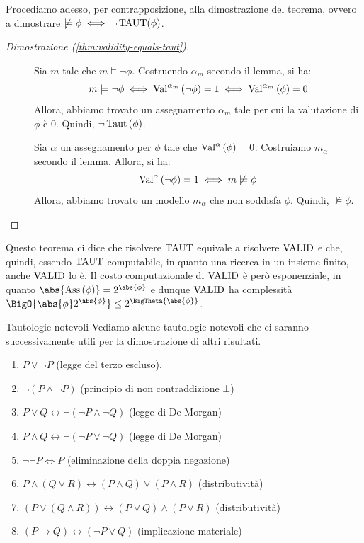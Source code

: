Procediamo adesso, per contrapposizione, alla dimostrazione del teorema, ovvero a dimostrare \(\not\models \phi \iff \neg \Taut(\phi)\).
\begin{proof}[Dimostrazione (\ref{thm:validity-equals-taut})]
  \begin{description}
    \item[\qi{\(\implies\)}]
      Sia \(m\) tale che \(m \models \neg \phi\).
      Costruendo \(\alpha_{m}\) secondo il lemma, si ha:
      \[m\models \neg \phi \iff \Val{\alpha_{m}}[\neg\phi]=1 \iff \Val{\alpha_{m}}[\phi]=0\]
      Allora, abbiamo trovato un assegnamento \(\alpha_{m}\) tale per cui la valutazione di \(\phi\) è \(0\). Quindi, \(\neg\Taut[\phi]\).
    \item[\qi{\(\impliedby\)}]
      Sia \(\alpha\) un assegnamento per \(\phi\) tale che \(\Val{\alpha}[\phi]=0\).
      Costruiamo \(m_{\alpha}\) secondo il lemma.
      Allora, si ha:
      \[\Val{\alpha}[\neg\phi]=1 \iff m \not\models \phi\]
      Allora, abbiamo trovato un modello \(m_{\alpha}\) che non soddisfa \(\phi\). Quindi, \(\not\models \phi\).
  \end{description}
\end{proof}

Questo teorema ci dice che risolvere \(\Taut\) equivale a risolvere \(\Valid\) e che, quindi, essendo \(\Taut\) computabile, in quanto una ricerca in un insieme finito, anche \(\Valid\) lo è.
Il costo computazionale di \(\Valid\) è però esponenziale, in quanto \(\abs{\Ass{\phi}} = 2^{\abs{\phi}}\) e dunque \(\Valid\) ha complessità \(\BigO{\abs{\phi}2^{\abs{\phi}}}\leq 2^{\BigTheta{\abs{\phi}}}\).

\begin{example}[namedlabel={ex:notable_tautologies}{Tautologie notevoli}]{Tautologie notevoli}
  Vediamo alcune tautologie notevoli che ci saranno successivamente utili per la dimostrazione di altri risultati.
  \begin{enumerate}
    \item \(P \lor \neg P\) (legge del terzo escluso).
    \item \(\neg (P \land \neg P)\) (principio di non contraddizione \(\bot\))
    \item \(P \lor Q \leftrightarrow \neg(\neg P \land \neg Q)\) (legge di De Morgan)
    \item \(P\land Q \leftrightarrow \neg(\neg P \lor \neg Q)\) (legge di De Morgan)
    \item \(\neg \neg P \iff P\) (eliminazione della doppia negazione)
    \item \(P \land(Q \lor R) \leftrightarrow (P \land Q) \lor (P \land R)\) (distributività)
    \item \((P \lor(Q\land R)) \leftrightarrow (P \lor Q) \land (P \lor R)\) (distributività)
    \item \((P \rightarrow Q) \leftrightarrow (\neg P \lor Q)\) (implicazione materiale)
  \end{enumerate}
\end{example}

